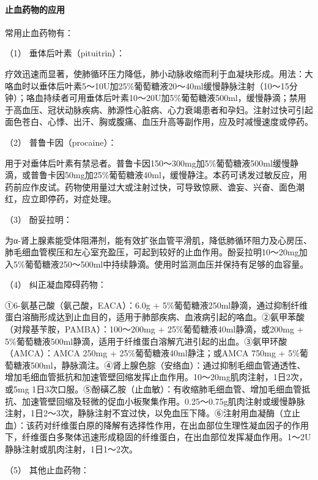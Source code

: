 \paragraph{止血药物的应用}

常用止血药物有：

\hypertarget{text00024.htmlux5cux23CHP1-9-4-2-3-1}{}
（1） 垂体后叶素（pituitrin）：

疗效迅速而显著，使肺循环压力降低，肺小动脉收缩而利于血凝块形成。用法：大咯血时以垂体后叶素5～10U加25\%葡萄糖液20～40ml缓慢静脉注射（10～15分钟）；咯血持续者可用垂体后叶素10～20U加5\%葡萄糖液500ml，缓慢静滴；禁用于高血压、冠状动脉疾病、肺源性心脏病、心力衰竭患者和孕妇。注射过快可引起面色苍白、心悸、出汗、胸或腹痛、血压升高等副作用，应及时减慢速度或停药。

\hypertarget{text00024.htmlux5cux23CHP1-9-4-2-3-2}{}
（2） 普鲁卡因（procaine）：

用于对垂体后叶素有禁忌者。普鲁卡因150～300mg加5\%葡萄糖液500ml缓慢静滴，或普鲁卡因50mg加25\%葡萄糖液40ml，缓慢静注。本药可诱发过敏反应，用药前应作皮试。药物使用量过大或注射过快，可导致惊厥、谵妄、兴奋、面色潮红，应立即停药，对症处理。

\hypertarget{text00024.htmlux5cux23CHP1-9-4-2-3-3}{}
（3） 酚妥拉明：

为α-肾上腺素能受体阻滞剂，能有效扩张血管平滑肌，降低肺循环阻力及心房压、肺毛细血管楔压和左心室充盈压，可起到较好的止血作用。酚妥拉明10～20mg加入5\%葡萄糖液250～500ml中持续静滴。使用时监测血压并保持有足够的血容量。

\hypertarget{text00024.htmlux5cux23CHP1-9-4-2-3-4}{}
（4） 纠正凝血障碍药物：

①6-氨基己酸（氨己酸，EACA）：6.0g +
5\%葡萄糖液250ml静滴，通过抑制纤维蛋白溶酶形成达到止血目的，适用于肺部疾病、血液病引起的咯血。②氨甲苯酸（对羧基苄胺，PAMBA）：100～200mg
+ 25\%葡萄糖液40ml静滴，或200mg +
5\%葡萄糖液500ml静滴，适用于纤维蛋白溶解亢进引起的出血。③氨甲环酸（AMCA）：AMCA
250mg + 25\%葡萄糖液40ml静注；或AMCA 750mg +
5\%葡萄糖液500ml，静脉滴注。④肾上腺色腙（安络血）：通过抑制毛细血管通透性、增加毛细血管抵抗和加速管壁回缩发挥止血作用。10～20mg肌肉注射，1日2次，或5mg
1日3次口服。⑤酚磺乙胺（止血敏）：有收缩肺毛细血管、增加毛细血管抵抗、加速管壁回缩及轻微的促血小板聚集作用。0.25～0.75g肌肉注射或缓慢静脉注射，1日2～3次，静脉注射不宜过快，以免血压下降。⑥注射用血凝酶（立止血）：该药对纤维蛋白原的降解有选择性作用，在出血部位生理性凝血因子的作用下，纤维蛋白多聚体迅速形成稳固的纤维蛋白，在出血部位发挥凝血作用。1～2U静脉注射或肌肉注射，1日1～2次。

\hypertarget{text00024.htmlux5cux23CHP1-9-4-2-3-5}{}
（5） 其他止血药物：

